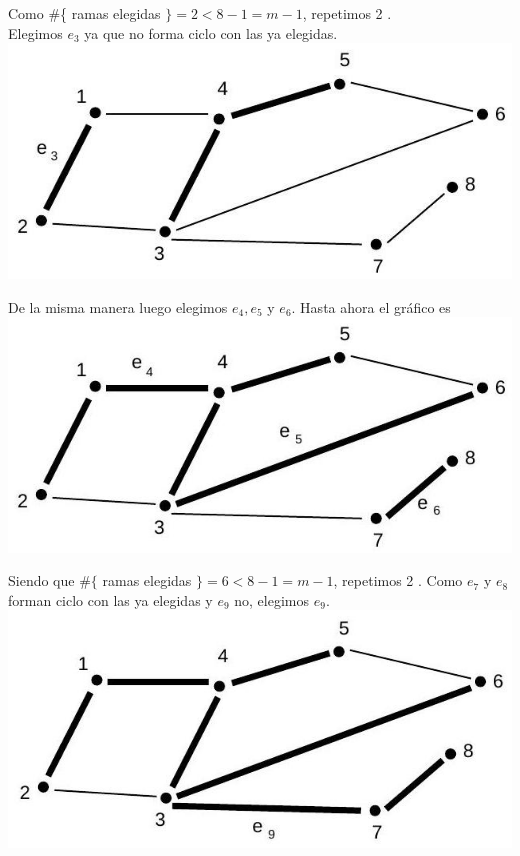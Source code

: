 \documentclass[10pt]{article}
\begin{document}
Como \#\{ ramas elegidas $\}=2<8-1=m-1$, repetimos 2 .\\
Elegimos $e_{3}$ ya que no forma ciclo con las ya elegidas.\\
\includegraphics[max width=\textwidth, center]{2025_09_05_93c7c1835f249f70c0eeg-16(2)}

De la misma manera luego elegimos $e_{4}, e_{5}$ y $e_{6}$. Hasta ahora el gráfico es\\
\includegraphics[max width=\textwidth, center]{2025_09_05_93c7c1835f249f70c0eeg-16}

Siendo que $\#\{$ ramas elegidas $\}=6<8-1=m-1$, repetimos 2 . Como $e_{7}$ y $e_{8}$ forman ciclo con las ya elegidas y $e_{9}$ no, elegimos $e_{9}$.\\
\includegraphics[max width=\textwidth, center]{2025_09_05_93c7c1835f249f70c0eeg-16(1)}
\end{document}
